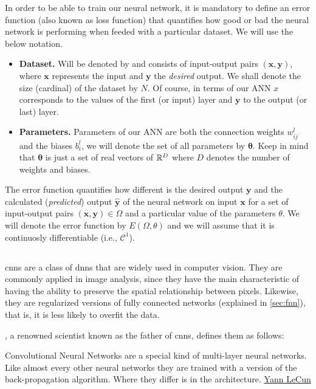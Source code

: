 In order to be able to train our neural network, it is mandatory to define an
error function (also known as loss function) that quantifies how good or bad
the neural network is performing when feeded with a particular dataset. We will
use the below notation.
\begin{itemize}
  \item \textbf{Dataset.} Will be denoted by and consists of input-output pairs
  \((\mathbf{x}, \mathbf{y})\), where \(\mathbf{x}\) represents the input and
  \(\mathbf{y}\) the \emph{desired} output. We shall denote the size (cardinal)
  of the dataset by \(N\). Of course, in terms of our ANN \(x\) corresponds to
  the values of the first (or input) layer and \(\mathbf{y}\) to the output (or
  last) layer.
  \item \textbf{Parameters.} Parameters of our ANN are both the connection
  weights \(w_{ij}^l\) and the biases \(b_i^l\), we will denote the set of all
  parameters by \(\bm{\theta}\). Keep in mind that \(\bm{\theta}\) is just a
  set of real vectors of \(\mathbb{R}^D\) where \(D\) denotes the number of weights and
  biases.
\end{itemize}

The error function quantifies how different is the desired output
\(\mathbf{y}\) and the calculated (\emph{predicted}) output
\(\mathbf{\hat{y}}\) of the neural network on input \(\mathbf{x}\) for a set of
input-output pairs \((\mathbf{x} , \mathbf{y}) \in \Omega\) and a particular
value of the parameters \(\theta\). We will denote the error function by
\(E (\Omega, \theta)\) and we will assume that it is continuosly differentiable
(i.e., \(\mathcal{C}^1\)).


\subsection{}%
\label{sec:conv-neur-netw}

\glspl{cnn} are a class of \glspl{dnn} that are widely used in computer
vision. They are commonly applied in image analysis, since they have the main
characteristic of having the ability to preserve the spatial relationship
between pixels. Likewise, they are regularized versions of fully connected
networks (explained in \vref{sec:fnn}), that is, it is less likely
to overfit the data.

, a renowned scientist
known as the father of \glspl{cnn}, defines them as follows:
\begin{quoteBox}
  Convolutional Neural Networks are a special kind of multi-layer neural
  networks. Like almost every other neural networks they are trained with a
  version of the back-propagation algorithm. Where they differ is in the
  architecture.
  \tcblower\href{http://yann.lecun.com/index.html}{Yann LeCun}
\end{quoteBox}

